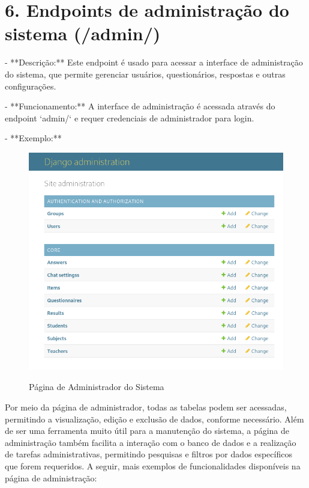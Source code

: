 \section*{6. Endpoints de administração do sistema (/admin/)}

- **Descrição:** Este endpoint é usado para acessar a interface de administração do sistema, que permite gerenciar usuários, questionários, respostas e outras configurações.

- **Funcionamento:** A interface de administração é acessada através do endpoint `admin/` e requer credenciais de administrador para login.

- **Exemplo:**

\begin{figure}[H]
    \centering
    \caption{Página de Administrador do Sistema}
    \includegraphics[width=1\textwidth]{figuras/admin.png}
    \label{fig:report_questions}
\end{figure}

Por meio da página de administrador, todas as tabelas podem ser acessadas, permitindo a visualização, edição e exclusão de dados, conforme necessário. Além de ser uma ferramenta muito útil para a manutenção do sistema, a página de administração também facilita a interação com o banco de dados e a realização de tarefas administrativas, permitindo pesquisas e filtros por dados específicos que forem requeridos. A seguir, mais exemplos de funcionalidades disponíveis na página de administração:

